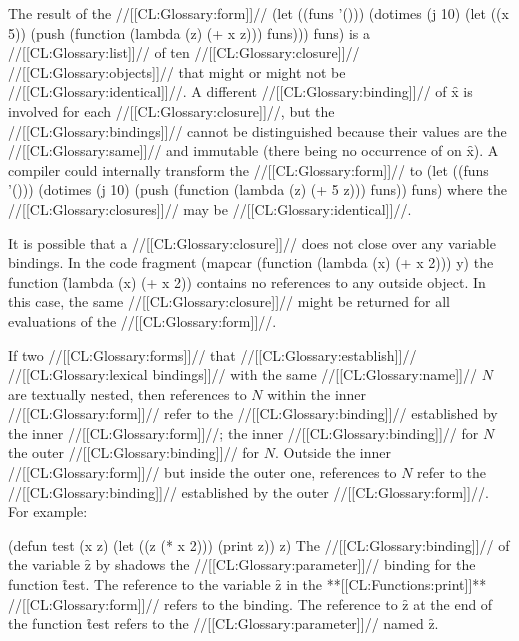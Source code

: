 The result of the //[[CL:Glossary:form]]//
  \code
 (let ((funs '()))
   (dotimes (j 10)
     (let ((x 5))
       (push (function (lambda (z) (+ x z)))
            funs)))
   funs) \endcode is a //[[CL:Glossary:list]]// of ten //[[CL:Glossary:closure]]// //[[CL:Glossary:objects]]// that might or might not be //[[CL:Glossary:identical]]//. A different //[[CL:Glossary:binding]]// of \f{x} is involved for each //[[CL:Glossary:closure]]//, but the //[[CL:Glossary:bindings]]// cannot be distinguished because their values are the //[[CL:Glossary:same]]// and immutable (there being no occurrence of  on \f{x}).  A compiler could internally transform the //[[CL:Glossary:form]]// to
  \code
 (let ((funs '()))
   (dotimes (j 10)
     (push (function (lambda (z) (+ 5 z)))
           funs))
  funs) \endcode where the //[[CL:Glossary:closures]]// may be //[[CL:Glossary:identical]]//.

 

It is possible that a //[[CL:Glossary:closure]]// does not close over any variable bindings. In the code fragment
  \code
 (mapcar (function (lambda (x) (+ x 2))) y) \endcode the function \f{(lambda (x) (+ x 2))} contains no references to any outside object. In this case, the same //[[CL:Glossary:closure]]// might be returned for all evaluations of the  //[[CL:Glossary:form]]//.

\endSubsection%
   

If two //[[CL:Glossary:forms]]// that //[[CL:Glossary:establish]]// //[[CL:Glossary:lexical bindings]]// with the same //[[CL:Glossary:name]]// $N$ are textually nested, then references to $N$ within the inner //[[CL:Glossary:form]]// refer to the //[[CL:Glossary:binding]]// established by the inner //[[CL:Glossary:form]]//; the inner //[[CL:Glossary:binding]]// for $N$  the outer //[[CL:Glossary:binding]]// for $N$.  Outside the inner //[[CL:Glossary:form]]// but inside the outer one, references to $N$ refer to the //[[CL:Glossary:binding]]// established by the outer //[[CL:Glossary:form]]//.  For example:

\code
 (defun test (x z)
   (let ((z (* x 2)))
     (print z))
   z) \endcode The //[[CL:Glossary:binding]]// of the variable \f{z} by  shadows the //[[CL:Glossary:parameter]]// binding for the function \f{test}.  The reference to the variable \f{z} in the **[[CL:Functions:print]]** //[[CL:Glossary:form]]// refers to the  binding. The reference to \f{z} at the end of the function \f{test}  refers to the //[[CL:Glossary:parameter]]// named \f{z}.

